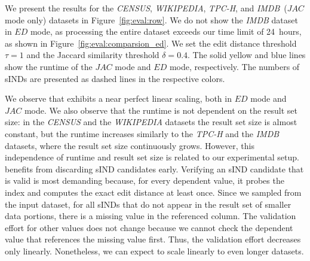We present the results for the \emph{CENSUS}, \emph{WIKIPEDIA}, \emph{TPC-H}, and \emph{IMDB}~($JAC$ mode only) datasets in Figure~\ref{fig:eval:row}.
We do not show the \emph{IMDB} dataset in $ED$ mode, as processing the entire dataset exceeds our time limit of 24~hours, as shown in Figure~\ref{fig:eval:comparsion_ed}.
We set the edit distance threshold $\tau=1$ and the Jaccard similarity threshold $\delta = 0.4$.
The solid yellow and blue lines show the runtime of the $JAC$ mode and $ED$ mode, respectively. %
The numbers of sINDs are presented as dashed lines in the respective colors.
%

We observe that \sawfish exhibits a near perfect linear scaling, both in $ED$ mode and $JAC$ mode.
We also observe that the runtime is not dependent on the result set size: in the \emph{CENSUS} and the \emph{WIKIPEDIA} datasets the result set size is almost constant, but the runtime increases similarly to the \emph{TPC-H} and the \emph{IMDB} datasets, where the result set size continuously grows.
However, this independence of runtime and result set size is related to our experimental setup.
\sawfish benefits from discarding sIND candidates early.
Verifying an sIND candidate that is valid is most demanding because, for every dependent value, it probes the index and computes the exact edit distance at least once.
Since we sampled from the input dataset, for all sINDs that do not appear in the result set of smaller data portions, there is a missing value in the referenced column.
The validation effort for other values does not change because we cannot check the dependent value that references the missing value first.
Thus, the validation effort decreases only linearly.
Nonetheless, we can expect \sawfish to scale linearly to even longer datasets.

